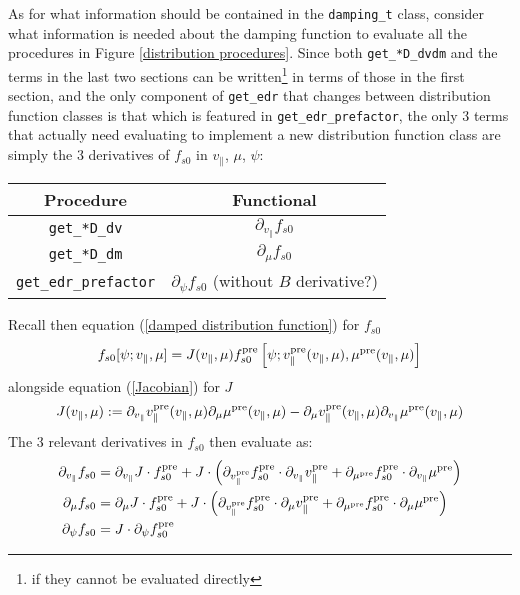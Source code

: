     

    As for what information should be contained in the {\tt damping\_t} class, consider what information is needed about the damping function to evaluate all the procedures in Figure \ref{distribution procedures}. Since both {\tt get\_*D\_dvdm} and the terms in the last two sections can be written\footnote{if they cannot be evaluated directly} in terms of those in the first section, and the only component of {\tt get\_edr} that changes between distribution function classes is that which is featured in {\tt get\_edr\_prefactor}, the only 3 terms that actually need evaluating to implement a new distribution function class are simply the 3 derivatives of $f_{s0}$ in $v_{\parallel}$, $\mu$, $\psi$:
    \begin{center}\begin{tabular}{ c | c }
        Procedure  &  Functional  \\
        \hline\hline
        {\tt get\_*D\_dv}  &  $\partial_{v_{\parallel}}f_{s0}$  \\
        \hline
        {\tt get\_*D\_dm}  &  $\partial_{\mu}f_{s0}$  \\
        \hline\hline
        {\tt get\_edr\_prefactor}  &  $\partial_{\psi}f_{s0}$ (without $B$ derivative?)
    \end{tabular}\end{center}
    Recall then equation (\ref{damped distribution function}) for $f_{s0}$
    \begin{equation*}
        f_{s0}[\psi; v_{\parallel}, \mu]  =  J(v_{\parallel}, \mu)f_{s0}^{\rm pre}\left[\psi; v_{\parallel}^{\rm pre}(v_{\parallel}, \mu), \mu^{\rm pre}(v_{\parallel}, \mu)\right]
    \end{equation*}
    alongside equation (\ref{Jacobian}) for $J$
    \begin{equation*}
        J(v_{\parallel}, \mu)  :=  \partial_{v_{\parallel}}v_{\parallel}^{\rm pre}(v_{\parallel}, \mu)\partial_{\mu}\mu^{\rm pre}(v_{\parallel}, \mu) - \partial_{\mu}v_{\parallel}^{\rm pre}(v_{\parallel}, \mu)\partial_{v_{\parallel}}\mu^{\rm pre}(v_{\parallel}, \mu)
    \end{equation*}
    The 3 relevant derivatives in $f_{s0}$ then evaluate as:
    \begin{align}
        \partial_{v_{\parallel}}f_{s0}
            &=  \partial_{v_{\parallel}}J\cdot f_{s0}^{\rm pre}
            + J\cdot\left(\partial_{v_{\parallel}^{\rm pre}}f_{s0}^{\rm pre}\cdot\partial_{v_{\parallel}}v_{\parallel}^{\rm pre}
            + \partial_{\mu^{\rm pre}}f_{s0}^{\rm pre}\cdot\partial_{v_{\parallel}}\mu^{\rm pre}\right)  \\
        \partial_{\mu}f_{s0}
            &=  \partial_{\mu}J\cdot f_{s0}^{\rm pre}
            + J\cdot\left(\partial_{v_{\parallel}^{\rm pre}}f_{s0}^{\rm pre}\cdot\partial_{\mu}v_{\parallel}^{\rm pre}
            + \partial_{\mu^{\rm pre}}f_{s0}^{\rm pre}\cdot\partial_{\mu}\mu^{\rm pre}\right)  \\
        \partial_{\psi}f_{s0}
            &=  J\cdot\partial_{\psi}f_{s0}^{\rm pre}
    \end{align}
